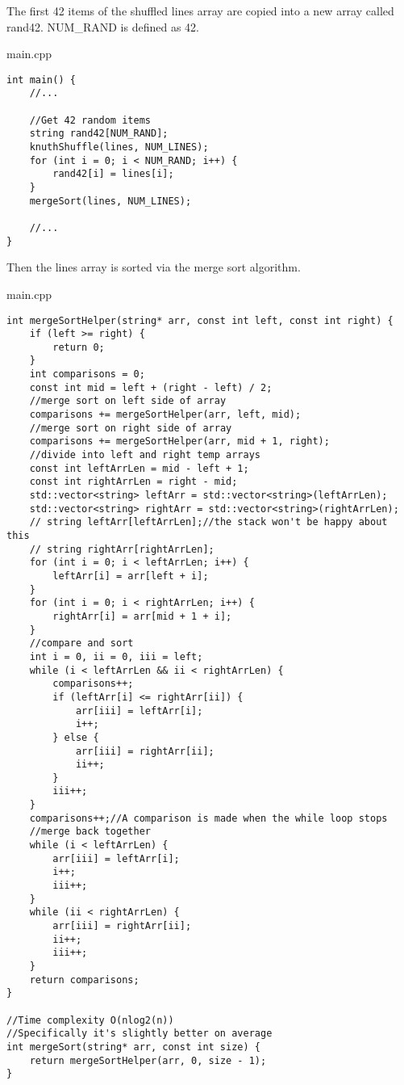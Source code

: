 \documentclass[letterpaper, 10pt,DIV=13]{scrartcl}
\numberwithin{equation}{section} %
\numberwithin{figure}{section} %
\numberwithin{table}{section} %
\begin{document}
The first 42 items of the shuffled lines array are copied into a new array called rand42.
NUM\_RAND is defined as 42.

main.cpp
\begin{verbatim}
int main() {
    //...

    //Get 42 random items
    string rand42[NUM_RAND];
    knuthShuffle(lines, NUM_LINES);
    for (int i = 0; i < NUM_RAND; i++) {
        rand42[i] = lines[i];
    }
    mergeSort(lines, NUM_LINES);

    //...
}
\end{verbatim}

Then the lines array is sorted via the merge sort algorithm.

main.cpp
\begin{verbatim}
int mergeSortHelper(string* arr, const int left, const int right) {
    if (left >= right) {
        return 0;
    }
    int comparisons = 0;
    const int mid = left + (right - left) / 2;
    //merge sort on left side of array
    comparisons += mergeSortHelper(arr, left, mid);
    //merge sort on right side of array
    comparisons += mergeSortHelper(arr, mid + 1, right);
    //divide into left and right temp arrays
    const int leftArrLen = mid - left + 1;
    const int rightArrLen = right - mid;
    std::vector<string> leftArr = std::vector<string>(leftArrLen);
    std::vector<string> rightArr = std::vector<string>(rightArrLen);
    // string leftArr[leftArrLen];//the stack won't be happy about this
    // string rightArr[rightArrLen];
    for (int i = 0; i < leftArrLen; i++) {
        leftArr[i] = arr[left + i];
    }
    for (int i = 0; i < rightArrLen; i++) {
        rightArr[i] = arr[mid + 1 + i];
    }
    //compare and sort
    int i = 0, ii = 0, iii = left;
    while (i < leftArrLen && ii < rightArrLen) {
        comparisons++;
        if (leftArr[i] <= rightArr[ii]) {
            arr[iii] = leftArr[i];
            i++;
        } else {
            arr[iii] = rightArr[ii];
            ii++;
        }
        iii++;
    }
    comparisons++;//A comparison is made when the while loop stops
    //merge back together
    while (i < leftArrLen) {
        arr[iii] = leftArr[i];
        i++;
        iii++;
    }
    while (ii < rightArrLen) {
        arr[iii] = rightArr[ii];
        ii++;
        iii++;
    }
    return comparisons;
}

//Time complexity O(nlog2(n))
//Specifically it's slightly better on average
int mergeSort(string* arr, const int size) {
    return mergeSortHelper(arr, 0, size - 1);
}
\end{verbatim}
\end{document}
